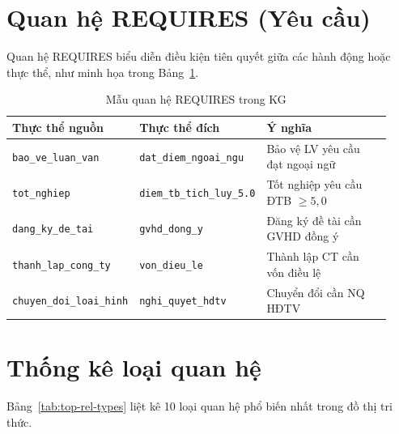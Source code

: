 \section{Quan hệ REQUIRES (Yêu cầu)}
\label{sec:app-requires}

Quan hệ REQUIRES biểu diễn điều kiện tiên quyết giữa các hành động hoặc thực thể,
như minh họa trong Bảng~\ref{tab:rel-requires}.

\begin{table}[htbp]
  \centering
  \caption{Mẫu quan hệ REQUIRES trong KG}
  \label{tab:rel-requires}
  \begin{tabular}{p{0.30\linewidth} p{0.30\linewidth} p{0.33\linewidth}}
    \toprule
    \textbf{Thực thể nguồn} & \textbf{Thực thể đích} & \textbf{Ý nghĩa} \\
    \midrule
    \texttt{bao\_ve\_luan\_van} & \texttt{dat\_diem\_ngoai\_ngu} &
    Bảo vệ LV yêu cầu đạt ngoại ngữ \\[4pt]

    \texttt{tot\_nghiep} & \texttt{diem\_tb\_tich\_luy\_5.0} &
    Tốt nghiệp yêu cầu ĐTB $\geq 5{,}0$ \\[4pt]

    \texttt{dang\_ky\_de\_tai} & \texttt{gvhd\_dong\_y} &
    Đăng ký đề tài cần GVHD đồng ý \\[4pt]

    \texttt{thanh\_lap\_cong\_ty} & \texttt{von\_dieu\_le} &
    Thành lập CT cần vốn điều lệ \\[4pt]

    \texttt{chuyen\_doi\_loai\_hinh} & \texttt{nghi\_quyet\_hdtv} &
    Chuyển đổi cần NQ HĐTV \\
    \bottomrule
  \end{tabular}
\end{table}

\section{Thống kê loại quan hệ}
\label{sec:app-thong-ke-quan-he}

Bảng~\ref{tab:top-rel-types} liệt kê 10 loại quan hệ phổ biến nhất trong đồ thị
tri thức.

